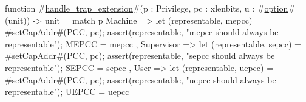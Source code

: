 function #\hyperref[sailRISCVzhandlezytrapzyextension]{handle\_trap\_extension}#(p : Privilege, pc : xlenbits, u : #\hyperref[sailRISCVzoption]{option}#(unit)) -> unit = {
  match p {
    Machine => {
      let (representable, mepcc) = #\hyperref[sailRISCVzsetCapAddr]{setCapAddr}#(PCC, pc);
      assert(representable, "mepcc should always be representable");
      MEPCC   = mepcc
    },
    Supervisor => {
      let (representable, sepcc) = #\hyperref[sailRISCVzsetCapAddr]{setCapAddr}#(PCC, pc);
      assert(representable, "sepcc should always be representable");
      SEPCC   = sepcc
    },
    User => {
      let (representable, uepcc) = #\hyperref[sailRISCVzsetCapAddr]{setCapAddr}#(PCC, pc);
      assert(representable, "uepcc should always be representable");
      UEPCC   = uepcc
    }
  }
}
